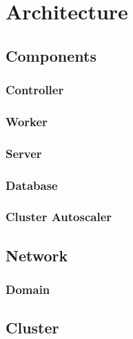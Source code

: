\chapter{Architecture}
\label{cha:architecture}

\section{Components}
\label{sec:architecture_components}

\subsection{Controller}
\label{subsec:architecture_components_controller}

\subsection{Worker}
\label{subsec:architecture_components_worker}

\subsection{Server}
\label{subsec:architecture_components_server}

\subsection{Database}
\label{subsec:architecture_components_database}

\subsection{Cluster Autoscaler}
\label{subsec:architecture_components_cluster_autoscaler}

\section{Network}
\label{sec:architecture_network}

\subsection{Domain}
\label{subsec:architecture_network_domain}

\section{Cluster}
\label{sec:architecture_cluster}

